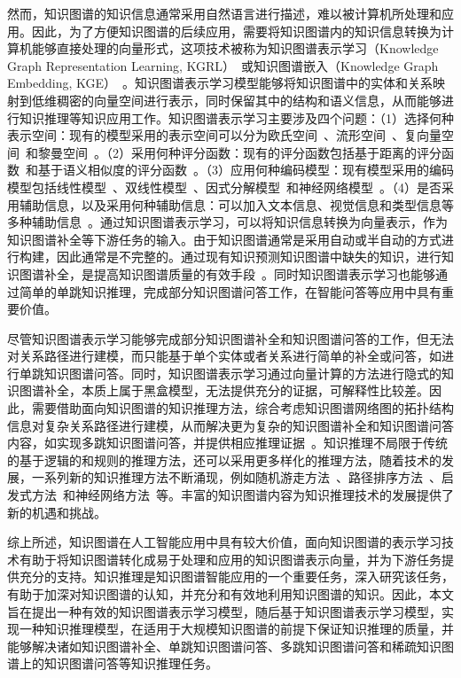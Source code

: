 \documentclass[algorithmlist, AutoFakeBold, AutoFakeSlant, figurelist, tablelist, nomlist, engineering, openany]{seuthesix} %
\begin{document}
然而，知识图谱的知识信息通常采用自然语言进行描述，难以被计算机所处理和应用。因此，为了方便知识图谱的后续应用，需要将知识图谱内的知识信息转换为计算机能够直接处理的向量形式，这项技术被称为知识图谱表示学习（Knowledge Graph Representation Learning, KGRL）~\cite{chen2022rlpath}或知识图谱嵌入（Knowledge Graph Embedding, KGE）~\cite{wang2021transet}。知识图谱表示学习模型能够将知识图谱中的实体和关系映射到低维稠密的向量空间进行表示，同时保留其中的结构和语义信息，从而能够进行知识推理等知识应用工作。知识图谱表示学习主要涉及四个问题：（1）选择何种表示空间：现有的模型采用的表示空间可以分为欧氏空间~\cite{lu2022dense}、流形空间~\cite{ebisu2018toruse}、复向量空间~\cite{trouillon2016complex}和黎曼空间~\cite{pan2021hyperbolic}。（2）采用何种评分函数：现有的评分函数包括基于距离的评分函数~\cite{sachan2020knowledge}和基于语义相似度的评分函数~\cite{xiao2017ssp}。（3）应用何种编码模型：现有模型采用的编码模型包括线性模型~\cite{peng2020lineare}、双线性模型~\cite{pan2021hyperbolic}、因式分解模型~\cite{ji2015knowledge}和神经网络模型~\cite{jiang2021kernel}。（4）是否采用辅助信息，以及采用何种辅助信息：可以加入文本信息、视觉信息和类型信息等多种辅助信息~\cite{wang2017knowledge}。通过知识图谱表示学习，可以将知识信息转换为向量表示，作为知识图谱补全等下游任务的输入。由于知识图谱通常是采用自动或半自动的方式进行构建，因此通常是不完整的。通过现有知识预测知识图谱中缺失的知识，进行知识图谱补全，是提高知识图谱质量的有效手段~\cite{vu2019capsule}。同时知识图谱表示学习也能够通过简单的单跳知识推理，完成部分知识图谱问答工作，在智能问答等应用中具有重要价值。

尽管知识图谱表示学习能够完成部分知识图谱补全和知识图谱问答的工作，但无法对关系路径进行建模，而只能基于单个实体或者关系进行简单的补全或问答，如进行单跳知识图谱问答。同时，知识图谱表示学习通过向量计算的方法进行隐式的知识图谱补全，本质上属于黑盒模型，无法提供充分的证据，可解释性比较差。因此，需要借助面向知识图谱的知识推理方法，综合考虑知识图谱网络图的拓扑结构信息对复杂关系路径进行建模，从而解决更为复杂的知识图谱补全和知识图谱问答内容，如实现多跳知识图谱问答，并提供相应推理证据~\cite{chen2020review}。知识推理不局限于传统的基于逻辑的和规则的推理方法，还可以采用更多样化的推理方法，随着技术的发展，一系列新的知识推理方法不断涌现，例如随机游走方法~\cite{jagvaral2020path}、路径排序方法~\cite{zhao2021target}、启发式方法~\cite{he2021heuristic}和神经网络方法~\cite{wang2018deep}等。丰富的知识图谱内容为知识推理技术的发展提供了新的机遇和挑战。

综上所述，知识图谱在人工智能应用中具有较大价值，面向知识图谱的表示学习技术有助于将知识图谱转化成易于处理和应用的知识图谱表示向量，并为下游任务提供充分的支持。知识推理是知识图谱智能应用的一个重要任务，深入研究该任务，有助于加深对知识图谱的认知，并充分和有效地利用知识图谱的知识。因此，本文旨在提出一种有效的知识图谱表示学习模型，随后基于知识图谱表示学习模型，实现一种知识推理模型，在适用于大规模知识图谱的前提下保证知识推理的质量，并能够解决诸如知识图谱补全、单跳知识图谱问答、多跳知识图谱问答和稀疏知识图谱上的知识图谱问答等知识推理任务。
\end{document}
